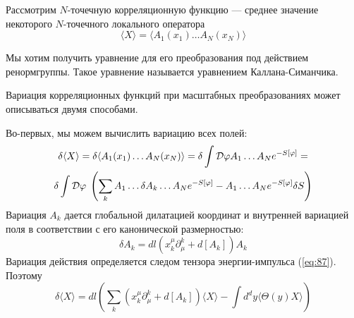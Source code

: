 \documentclass[a4paper,12pt]{article}
\theoremstyle{definition}
\theoremstyle{definition}
\theoremstyle{definition}
\begin{document}
Рассмотрим $N$-точечную корреляционную функцию --- среднее значение некоторого $N$-точечного локального оператора
\begin{equation}
  \label{eq:81}
  \langle X\rangle =\langle A_1 (x_1)\dots A_N (x_N)\rangle
\end{equation}

Мы хотим получить уравнение для его преобразования под действием ренормгруппы. Такое уравнение называется уравнением Каллана-Симанчика. 

Вариация корреляционных функций при масштабных преобразованиях может описываться двумя способами.

Во-первых, мы можем вычислить вариацию всех полей:
\begin{multline}
  \label{eq:82}
  \delta \langle X\rangle=\delta \langle A_1(x_1)\dots A_N (x_N)\rangle = \delta \int {\cal D}\varphi A_1 \dots A_N e^{-S[\varphi]} = \\
  \delta \int {\cal D} \varphi\; \left( \sum_k A_1 \dots \delta A_k \dots A_N e^{-S[\varphi]} -A_1\dots A_N e^{-S[\varphi]}\delta S\right)
\end{multline}
Вариация $A_k$ дается глобальной дилатацией координат и внутренней вариацией поля в соответствии с его канонической размерностью:
\begin{equation}
  \label{eq:88}
  \delta A_k=dl (x^{\mu}_k\partial^k_{\mu}+d[A_k]) A_k
\end{equation}
Вариация действия определяется следом тензора энергии-импульса (\ref{eq:87}). Поэтому
\begin{equation}
  \label{eq:89}
  \delta\langle X\rangle=dl \left(\sum_k (x_k^{\mu}\partial_{\mu}^k+d[A_k])\langle X\rangle-\int d^d y \langle\Theta(y)X\rangle\right)
\end{equation}
\end{document}
